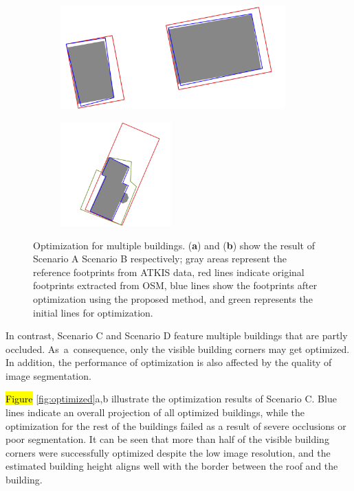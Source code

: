 \begin{figure}[H]
    \centering
\begin{subfigure}[tbp]{0.47\columnwidth}
           \centering
           \includegraphics[height=4cm]{optimize/finning_overlay.png}
           \caption[]{}
           {{\small }}
           \label{fig:6a}
       \end{subfigure}
       \begin{subfigure}[tbp]{0.47\columnwidth}
           \centering
           \includegraphics[height=4cm]{optimize/kiga_overlay.png}
           \caption[]{}%
           {{\small }}
           \label{fig:6b}
       \end{subfigure}
       \caption{Optimization for multiple buildings. (\textbf{a}) and (\textbf{b}) show the result of Scenario A Scenario B respectively; gray areas represent the reference footprints from ATKIS 
data, red lines indicate original footprints extracted from OSM, blue lines show the footprints after optimization using the proposed method, and green represents the initial lines for optimization.}
       \label{fig:overlay}
\end{figure}

In contrast, Scenario C and Scenario D feature multiple buildings that are partly occluded. \mbox{As a consequence}, only the visible building corners may get optimized. In addition, the performance of optimization is also affected by the quality of image segmentation. 

\hl{Figure} \ref{fig:optimized}a,b illustrate the optimization results of Scenario C. Blue lines indicate an overall projection of all optimized buildings, while the optimization for the rest of the buildings failed as a result of severe occlusions or poor segmentation. It can be seen that more than half of the visible building corners were successfully optimized despite the low image resolution, and the estimated building height aligns well with the border between the roof and the building.

